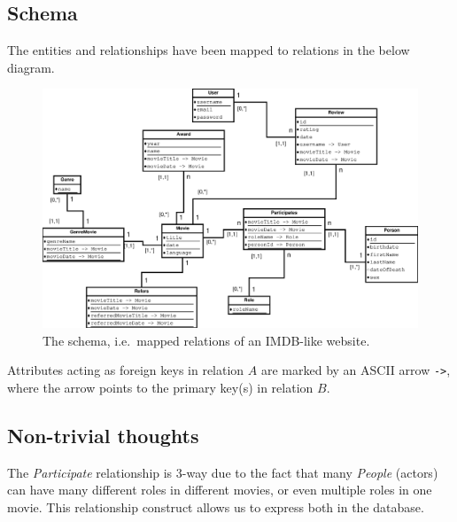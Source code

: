 \subsection{Schema}
The entities and relationships have been mapped to relations in the below diagram.
\begin{figure}[H]
  \centering
  \includegraphics[width=\linewidth]{2-17.02.14/DatabaseSchema.eps}
  \caption{The schema, i.e.\ mapped relations of an IMDB-like website.}\label{fig:schema}
\end{figure}
Attributes acting as foreign keys in relation $A$ are marked by an ASCII arrow \texttt{->}, where the arrow points to the primary key(s) in relation $B$.

\subsection{Non-trivial thoughts}
The \emph{Participate} relationship is 3-way due to the fact that many \emph{People} (actors) can have many different roles in different movies, or even multiple roles in one movie. This relationship construct allows us to express both in the database.
